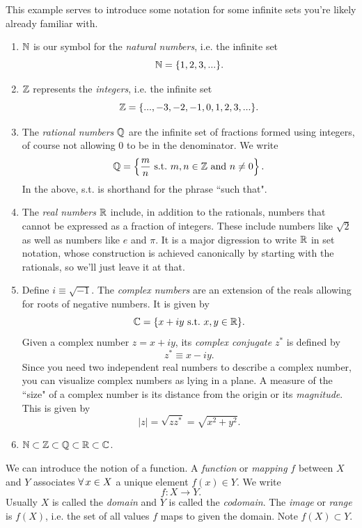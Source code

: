 \begin{example*}{}{}
  This example serves to introduce some notation for some infinite 
  sets you're likely already familiar with.
  \begin{enumerate}
    \item $\mathbb{N}$ is our symbol for the {\it natural
          numbers}, i.e. the infinite set
          $$ \mathbb{N}=\{1,2,3,...\}. $$
    \item $\mathbb{Z}$ represents the {\it integers}, i.e. the infinite
          set
          $$ \mathbb{Z}=\{...,-3,-2,-1,0,1,2,3,...\}. $$
    \item The {\it rational numbers} $\mathbb{Q}$ are the 
          infinite set of
          fractions formed using integers, of course not allowing 0 to be in the
          denominator. We write
          $$ \mathbb{Q}=\left\{\frac{m}{n} ~\text{s.t.}~  m,n\in \mathbb{Z}~\text{and}~n\neq0\right\}. $$
          In the above, s.t. is shorthand for the phrase ``such that".
    \item The {\it real numbers} $\mathbb{R}$ include, in addition to the
          rationals, numbers that cannot be expressed as a fraction of integers.
          These include numbers like $\sqrt{2}$ as well as numbers like
          $e$ and $\pi$. It is a major digression to write $\mathbb{R}$ in set notation,
          whose construction is achieved canonically by starting with the rationals, 
          so we'll just leave it at that.
    \item Define $i\equiv\sqrt{-1}$. The {\it complex
          numbers} are an extension of the reals allowing for roots of negative
          numbers. It is given by
          $$ \mathbb{C}=\{x+iy ~\text{s.t.}~ x,y\in\mathbb{R} \}. $$
          Given a complex number $z=x+iy$, its {\it complex
          conjugate} $z^*$ is defined by
          $$ z^*\equiv x-iy.$$
          Since you need two independent real numbers to describe a complex
          number, you can visualize complex numbers as lying in a plane. A
          measure of the ``size" of a complex number is its distance from 
          the origin or its {\it magnitude}. This is given by
          $$ |z| = \sqrt{zz^*} = \sqrt{x^2+y^2}. $$
    \item $\mathbb{N}\subset \mathbb{Z} \subset \mathbb{Q} \subset \mathbb{R} \subset \mathbb{C}$.
          
  \end{enumerate}
\end{example*}


We can introduce the notion of a function. A 
{\it function} or {\it mapping} $f$ between $X$ and $Y$ 
associates $\operatorname{\forall} x\in X$ a unique element $f(x)\in Y$. We 
write
\begin{equation}
f:X\to Y.
\end{equation}
Usually $X$ is called the {\it domain} 
and $Y$ is called the {\it codomain}.
The {\it image} or {\it range}
is $f(X)$, i.e. the set of all values $f$
 maps to given the domain. Note $f(X)\subset Y$.

